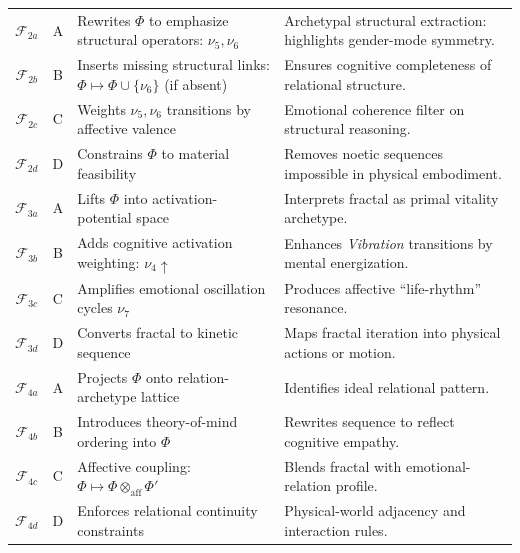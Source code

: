 \documentclass[11pt,twoside,openright]{book}
\theoremstyle{definition}
\theoremstyle{plain}
\theoremstyle{remark}
\newcommand{\Foundations}{\mathcal{F}}
\newcommand{\noe}[1]{\nu_{#1}}
\newcommand{\Frac}{\Phi}
\begin{document}
\begin{longtable}{c|c|p{5cm}|p{5cm}}
$\Foundations_{2a}$ & A & Rewrites $\Frac$ to emphasize structural operators: $\noe{5},\noe{6}$ &
Archetypal structural extraction: highlights gender-mode symmetry. \\

$\Foundations_{2b}$ & B & Inserts missing structural links: $\Frac \mapsto \Frac \cup \{\noe{6}\}$ (if absent) &
Ensures cognitive completeness of relational structure. \\

$\Foundations_{2c}$ & C & Weights $\noe{5},\noe{6}$ transitions by affective valence &
Emotional coherence filter on structural reasoning. \\

$\Foundations_{2d}$ & D & Constrains $\Frac$ to material feasibility &
Removes noetic sequences impossible in physical embodiment. \\

\midrule

$\Foundations_{3a}$ & A & Lifts $\Frac$ into activation-potential space &
Interprets fractal as primal vitality archetype. \\

$\Foundations_{3b}$ & B & Adds cognitive activation weighting: $\noe{4} \uparrow$ &
Enhances \emph{Vibration} transitions by mental energization. \\

$\Foundations_{3c}$ & C & Amplifies emotional oscillation cycles $\noe{7}$ &
Produces affective ``life-rhythm'' resonance. \\

$\Foundations_{3d}$ & D & Converts fractal to kinetic sequence &
Maps fractal iteration into physical actions or motion. \\

\midrule

$\Foundations_{4a}$ & A & Projects $\Frac$ onto relation-archetype lattice &
Identifies ideal relational pattern. \\

$\Foundations_{4b}$ & B & Introduces theory-of-mind ordering into $\Frac$ &
Rewrites sequence to reflect cognitive empathy. \\

$\Foundations_{4c}$ & C & Affective coupling: $\Frac \mapsto \Frac \otimes_{\mathrm{aff}} \Frac'$ &
Blends fractal with emotional-relation profile. \\

$\Foundations_{4d}$ & D & Enforces relational continuity constraints &
Physical-world adjacency and interaction rules. \\


\end{longtable}
\end{document}
